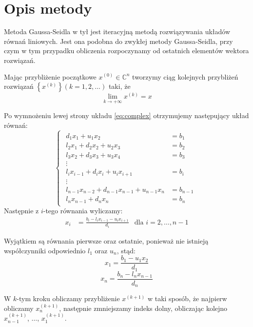 \documentclass[12pt]{article}
\begin{document}
	
	\section{Opis metody}
	Metoda Gaussa-Seidla w tył jest iteracyjną metodą rozwiązywania układów równań liniowych. Jest ona podobna do zwykłej metody Gaussa-Seidla, przy czym w tym przypadku obliczenia rozpoczynamy od ostatnich elementów wektora rozwiązań.
	
	
	Mając przybliżenie początkowe $x^{(0)} \in \mathbb{C}^n$ tworzymy ciąg kolejnych przybliżeń rozwiązań $\left\{ x^{(k)} \right\} (k = 1, 2, \dots)$ taki, że
	$$\lim_{k \to +\infty} x^{(k)} = x$$
	
	Po wymnożeniu lewej strony układu \eqref{eq:complex} otrzymujemy następujący układ równań:
	\[
	\begin{cases}
		\begin{aligned}
			d_1 x_1 + u_1 x_2                               & = b_1     \\
			l_2 x_1 + d_2 x_2 + u_2 x_3                     & = b_2     \\
			l_3 x_2 + d_3 x_3 + u_3 x_4                     & = b_3     \\
			\vdots    \hspace{1em}                          &  \\
			l_i x_{i-1} + d_i x_i + u_i x_{i+1}             & = b_i     \\
			\vdots        \hspace{1em}                      &  \\
			l_{n-1} x_{n-2} + d_{n-1} x_{n-1} + u_{n-1} x_n & = b_{n-1} \\
			l_n x_{n-1} + d_n x_n                           & = b_n
		\end{aligned}
	\end{cases}
	\]
	Następnie z $i$-tego równania wyliczamy:
	\begin{align*}
		x_i & = \frac{b_i - l_i x_{i-1} - u_i x_{i+1}}{d_i} & \text{dla } i = 2, \dots, n-1
	\end{align*}
	
	Wyjątkiem są równania pierwsze oraz ostatnie, ponieważ nie istnieją współczynniki odpowiednio $l_1$ oraz $u_n$, stąd:
	$$
	x_1 = \frac{b_1 - u_1 x_2}{d_1}
	$$
	$$
	x_n = \frac{b_n - l_n x_{n-1}}{d_n}
	$$
	
	W $k$-tym kroku obliczamy przybliżenie $x^{(k+1)}$ w taki sposób, że najpierw obliczamy $x^{(k+1)}_n$, następnie zmniejszamy indeks dolny, obliczając kolejno $x^{(k+1)}_{n-1}$, $\dots$, $x^{(k+1)}_1$.
	
\end{document}
